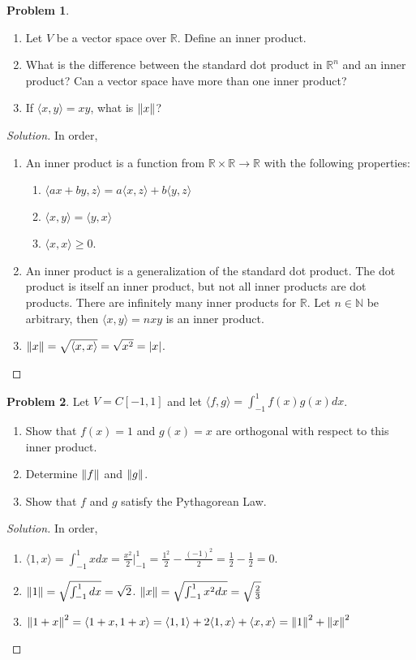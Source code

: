 \documentclass[oneside]{book}
\theoremstyle{definition}
\newtheorem{problem}{Problem}[section]
\begin{document}
\begin{problem}
\begin{enumerate}
\item Let $V$ be a vector space over $\mathbb{R}$. Define an inner product.
\item What is the difference between the standard dot product in $\mathbb{R}^n$ and an inner product? Can a vector space have more than one inner product?
\item If $\langle x,y \rangle = xy$, what is $\norm{x}$?
\end{enumerate}
\end{problem}
\begin{proof}[Solution]
In order,
\begin{enumerate}
\item An inner product is a function from $\mathbb{R}\times \mathbb{R}\rightarrow \mathbb{R}$ with the following properties:
\begin{enumerate}
\item $\langle ax+by,z\rangle = a\langle x,z\rangle+b\langle y,z\rangle$
\item $\langle x,y\rangle = \langle y,x \rangle$
\item $\langle x,x\rangle \geq 0$.
\end{enumerate}
\item An inner product is a generalization of the standard dot product. The dot product is itself an inner product, but not all inner products are dot products. There are infinitely many inner products for $\mathbb{R}$. Let $n\in \mathbb{N}$ be arbitrary, then $\langle x,y \rangle = nxy$ is an inner product.
\item $\norm{x} = \sqrt{\langle x,x \rangle } = \sqrt{x^2}= |x|$.
\end{enumerate}
\end{proof}

\begin{problem}
Let $V = C[-1,1]$ and let $\langle f,g\rangle = \int_{-1}^{1} f(x)g(x)dx$.
\begin{enumerate}
\item Show that $f(x)=1$ and $g(x) = x$ are orthogonal with respect to this inner product.
\item Determine $\norm{f}$ and $\norm{g}$.
\item Show that $f$ and $g$ satisfy the Pythagorean Law.
\end{enumerate}
\end{problem}
\begin{proof}[Solution]
In order,
\begin{enumerate}
\item $\langle 1,x\rangle = \int_{-1}^{1} xdx = \frac{x^2}{2}\big|_{-1}^{1} = \frac{1^2}{2}-\frac{(-1)^2}{2} = \frac{1}{2}-\frac{1}{2} = 0$.
\item $\norm{1} = \sqrt{ \int_{-1}^{1} dx} = \sqrt{2}$. $\norm{x} = \sqrt{\int_{-1}^{1}x^2dx} = \sqrt{\frac{2}{3}}$
\item $\norm{1+x}^2 = \langle 1+x,1+x\rangle = \langle 1,1\rangle + 2\langle 1,x \rangle + \langle x,x\rangle = \norm{1}^2 + \norm{x}^2$
\end{enumerate}
\end{proof}
\end{document}
